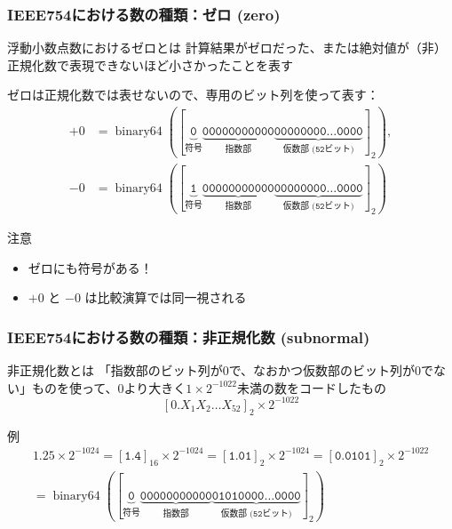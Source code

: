 \documentclass[aspectratio=169]{beamer}
\newcommand{\hexa}[1]{[\texttt{#1}]_{16}}
\newcommand{\binary}[1]{[\texttt{#1}]_{2}}
\begin{document}
\begin{frame}\frametitle{IEEE754における数の種類：ゼロ (zero)}
  \begin{block}{浮動小数点数におけるゼロとは}
    計算結果がゼロだった、または絶対値が（非）正規化数で表現できないほど小さかったことを表す
  \end{block}

  ゼロは正規化数では表せないので、専用のビット列を使って表す：
  \begin{align*}
    +0&=\operatorname{binary64}(
        [\mathtt{
        \underbrace{0}_{符号}
        \underbrace{000 0000 0000}_{\text{指数部}}
        \underbrace{0000 0000 \dotsc 0000}_{\text{仮数部 (52ビット)}}
        }]_2
        ), \\
    -0&=\operatorname{binary64}(
        [\mathtt{
        \underbrace{1}_{符号}
        \underbrace{000 0000 0000}_{\text{指数部}}
        \underbrace{0000 0000 \dotsc 0000}_{\text{仮数部 (52ビット)}}
        }]_2
        )
  \end{align*}
  \begin{block}{注意}
    \begin{itemize}
    \item ゼロにも符号がある！
    \item \(+0\) と \(-0\) は比較演算では同一視される
    \end{itemize}
  \end{block}
\end{frame}

\begin{frame}\frametitle{IEEE754における数の種類：非正規化数 (subnormal)}
  \begin{block}{非正規化数とは}
    「指数部のビット列が0で、なおかつ仮数部のビット列が0でない」ものを使って、0より大きく\(1\times 2^{-1022}\)未満の数をコードしたもの
    \[[0.X_1X_2\dots X_{52}]_2\times 2^{-1022}\]
  \end{block}


  \begin{exampleblock}{例}
    \begin{gather*}
      1.25\times 2^{-1024}=\hexa{1.4}\times 2^{-1024}=\binary{1.01}\times 2^{-1024}=\binary{0.0101}\times 2^{-1022} \\
      =\operatorname{binary64}(
      [\mathtt{
        \underbrace{0}_{符号}
        \underbrace{000 0000 0000}_{\text{指数部}}
        \underbrace{0101 0000 \dotsc 0000}_{\text{仮数部 (52ビット)}}
      }]_2
      )
    \end{gather*}
  \end{exampleblock}
\end{frame}
\end{document}
